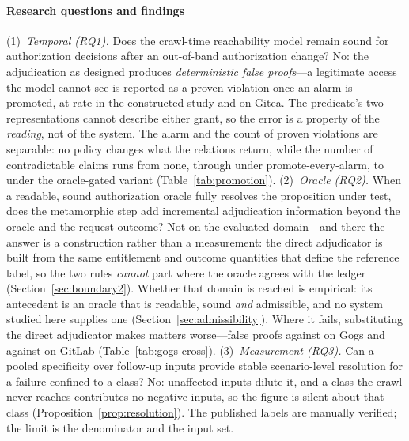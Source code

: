 \paragraph{Research questions and findings}
(1)~\emph{Temporal (RQ1).} Does the crawl-time reachability model remain sound for
authorization decisions after an out-of-band authorization change? No: the
adjudication as designed produces \emph{deterministic false proofs}---a legitimate
access the model cannot see is reported as a proven violation once an alarm is
promoted, at rate \ResObsOobVtwoFpRate{} in the constructed study and
\ResRsMrBookkeepingFpRate{} on Gitea. The predicate's two representations cannot
describe either grant, so the error is a property of the \emph{reading}, not of the
system. The alarm and the count of proven violations are separable: no policy
changes what the relations return, while the number of contradictable claims runs
from none, through \PolPallFalse{} under promote-every-alarm, to \PolPoracleFalse{}
under the oracle-gated variant (Table~\ref{tab:promotion}).
(2)~\emph{Oracle (RQ2).} When a readable, sound authorization oracle fully resolves
the proposition under test, does the metamorphic step add incremental adjudication
information beyond the oracle and the request outcome? Not on the evaluated
domain---and there the answer is a construction rather than a measurement: the
direct adjudicator is built from the same entitlement and outcome quantities that
define the reference label, so the two rules \emph{cannot} part where the oracle
agrees with the ledger (Section~\ref{sec:boundary2}). Whether that domain is reached
is empirical: its antecedent is an oracle that is readable, sound \emph{and}
admissible, and no system studied here supplies one
(Section~\ref{sec:admissibility}). Where it fails, substituting the direct
adjudicator makes matters worse---false proofs \GgFpDirectObserve{} against
\GgFpVthree{} on Gogs and \GlFpDirectObserve{} against \GlFpVthree{} on GitLab
(Table~\ref{tab:gogs-cross}).
(3)~\emph{Measurement (RQ3).} Can a pooled specificity over follow-up inputs provide
stable scenario-level resolution for a failure confined to a class? No: unaffected
inputs dilute it, and a class the crawl never reaches contributes no negative inputs,
so the figure is silent about that class (Proposition~\ref{prop:resolution}). The
published labels are manually verified; the limit is the denominator and the input
set.

